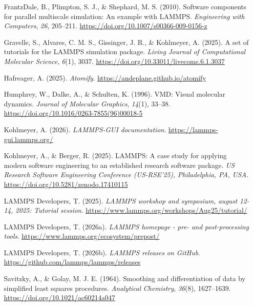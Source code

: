 \documentclass[
]{article}
\newlength{\cslhangindent}
\newenvironment{CSLReferences}[2] %
 {\begin{list}{}{%
  \setlength{\itemindent}{0pt}
  \setlength{\leftmargin}{0pt}
  \setlength{\parsep}{0pt}
  \ifodd #1
   \setlength{\leftmargin}{\cslhangindent}
   \setlength{\itemindent}{-1\cslhangindent}
  \fi
  \setlength{\itemsep}{#2\baselineskip}}}
 {\end{list}}
\begin{document}
\protect{}\label{refs}
\begin{CSLReferences}{1}{0}
FrantzDale, B., Plimpton, S. J., \& Shephard, M. S. (2010). Software
components for parallel multiscale simulation: An example with {LAMMPS}.
\emph{Engineering with Computers}, \emph{26}, 205--211.
\url{https://doi.org/10.1007/s00366-009-0156-z}

Gravelle, S., Alvares, C. M. S., Gissinger, J. R., \& Kohlmeyer, A.
(2025). A set of tutorials for the {LAMMPS} simulation package.
\emph{Living Journal of Computational Molecular Science}, \emph{6}(1),
3037. \url{https://doi.org/10.33011/livecoms.6.1.3037}

Hafreager, A. (2025). \emph{Atomify}.
\url{https://andeplane.github.io/atomify}

Humphrey, W., Dalke, A., \& Schulten, K. (1996). {VMD}: Visual molecular
dynamics. \emph{Journal of Molecular Graphics}, \emph{14}(1), 33--38.
\url{https://doi.org/10.1016/0263-7855(96)00018-5}

Kohlmeyer, A. (2026). \emph{{LAMMPS-GUI} documentation}.
\url{https://lammps-gui.lammps.org/}

Kohlmeyer, A., \& Berger, R. (2025). {LAMMPS}: A case study for applying
modern software engineering to an established research software package.
\emph{US Research Software Engineering Conference (US-RSE'25),
Philadelphia, PA, USA}. \url{https://doi.org/10.5281/zenodo.17410115}

LAMMPS Developers, T. (2025). \emph{{LAMMPS} workshop and symposium,
august 12-14, 2025: Tutorial session}.
\url{https://www.lammps.org/workshops/Aug25/tutorial/}

LAMMPS Developers, T. (2026a). \emph{{LAMMPS} homepage - pre- and
post-processing tools}. \url{https://www.lammps.org/ecosystem/prepost/}

LAMMPS Developers, T. (2026b). \emph{{LAMMPS} releases on {GitHub}}.
\url{https://github.com/lammps/lammps/releases}

Savitzky, A., \& Golay, M. J. E. (1964). Smoothing and differentiation
of data by simplified least squares procedures. \emph{Analytical
Chemistry}, \emph{36}(8), 1627--1639.
\url{https://doi.org/10.1021/ac60214a047}


\end{CSLReferences}
\end{document}
